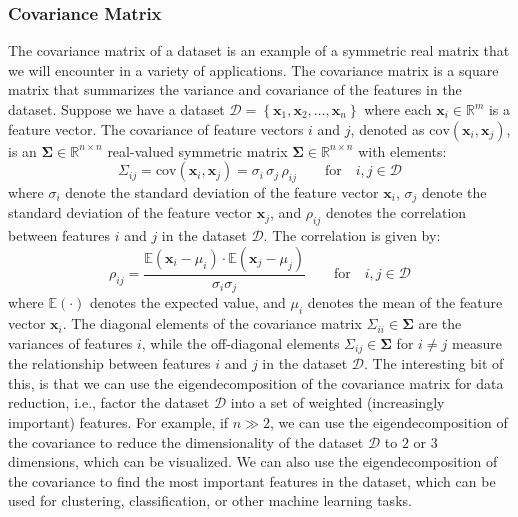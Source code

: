 \documentclass{article}[11pt]
\def\R{\mathbb{R}}
\def\D{\mathcal{D}}
\begin{document}
\subsubsection*{Covariance Matrix}
The covariance matrix of a dataset is an example of a symmetric real matrix that we will encounter in a variety of applications.
The covariance matrix is a square matrix that summarizes the variance and covariance of the features in the dataset.
Suppose we have a dataset $\D = \left\{\mathbf{x}_{1},\mathbf{x}_{2},\dots,\mathbf{x}_{n}\right\}$ where each $\mathbf{x}_{i}\in\mathbb{R}^{m}$ is a feature vector.
The covariance of feature vectors $i$ and $j$, denoted as $\text{cov}\left(\mathbf{x}_{i},\mathbf{x}_{j}\right)$, is an $\mathbf{\Sigma}\in\mathbb{R}^{n\times{n}}$ 
real-valued symmetric matrix $\mathbf{\Sigma}\in\R^{n\times{n}}$ with elements: 
\begin{equation}
    \Sigma_{ij} = \text{cov}\left(\mathbf{x}_{i},\mathbf{x}_{j}\right) = \sigma_{i}\,\sigma_{j}\,\rho_{ij}\qquad\text{for}\quad{i,j \in \mathcal{D}}
\end{equation}
where $\sigma_{i}$ denote the standard deviation of the feature vector $\mathbf{x}_{i}$, $\sigma_{j}$ denote the standard deviation of the 
feature vector $\mathbf{x}_{j}$, and $\rho_{ij}$ denotes the correlation between features $i$ and $j$ in the dataset $\D$. The correlation is given by:
\begin{equation}
\rho_{ij} = \frac{\mathbb{E}(\mathbf{x}_{i}-\mu_{i})\cdot\mathbb{E}(\mathbf{x}_{j} - \mu_{j})}{\sigma_{i}\sigma_{j}}\qquad\text{for}\quad{i,j \in \mathcal{D}}
\end{equation}
where $\mathbb{E}(\cdot)$ denotes the expected value, and $\mu_{i}$ denotes the mean of the feature vector $\mathbf{x}_{i}$.
The diagonal elements of the covariance matrix $\Sigma_{ii}\in\mathbf{\Sigma}$ are the variances of features $i$,
while the off-diagonal elements $\Sigma_{ij}\in\mathbf{\Sigma}$ for $i\neq{j}$ measure the relationship between features 
$i$ and $j$ in the dataset $\mathcal{D}$. The interesting bit of this, is that we can use the eigendecomposition of the covariance matrix for data reduction, 
i.e., factor the dataset $\D$ into a set of weighted (increasingly important) features. For example, if $n\gg{2}$, 
we can use the eigendecomposition of the covariance to reduce the dimensionality of the dataset $\D$ to $2$ or $3$ dimensions, which can be visualized.
We can also use the eigendecomposition of the covariance to find the most important features in the dataset, which can be used for clustering, classification, or other machine learning tasks.
\end{document}
